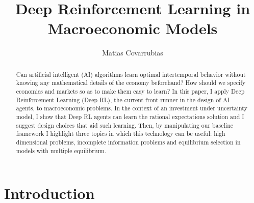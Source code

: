 \documentclass[11pt,english]{article}
\begin{document}
\title{Deep Reinforcement Learning in Macroeconomic Models}
\author{Matias Covarrubias}
\maketitle
\begin{abstract}
Can artificial intelligent (AI) algorithms learn optimal intertemporal behavior without knowing any mathematical details of the economy beforehand?  How should we specify economies and markets so as to make them easy to learn? In this paper, I apply Deep Reinforcement Learning (Deep RL), the current front-runner in the design of AI agents, to macroeconomic problems. In the context of an investment under uncertainty model, I show that Deep RL agents can learn the rational expectations solution and I suggest design choices that aid such learning. Then, by manipulating our baseline framework I highlight three topics in which this technology can be useful: high dimensional problems, incomplete information problems and equilibrium selection in models with multiple equilibrium.
\end{abstract}

\newpage 
\section{Introduction}
\end{document}
